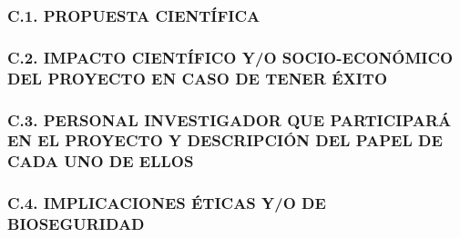 \subsubsection*{C.1. PROPUESTA CIENT\'IFICA}

\subsubsection*{C.2. IMPACTO CIENT\'IFICO Y/O SOCIO-ECON\'OMICO DEL PROYECTO EN CASO DE TENER \'EXITO}

\subsubsection*{C.3. PERSONAL INVESTIGADOR QUE PARTICIPAR\'A EN EL PROYECTO Y DESCRIPCI\'ON DEL PAPEL DE CADA UNO DE ELLOS}

\subsubsection*{C.4. IMPLICACIONES \'ETICAS Y/O DE BIOSEGURIDAD}